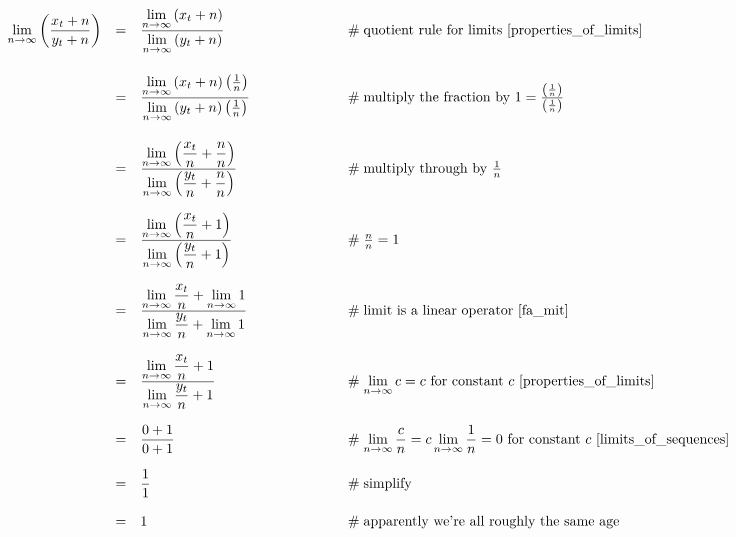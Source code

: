 \documentclass[11pt, oneside]{article}          %
\theoremstyle{definition}
\begin{document}
\begin{equation*}
\begin{array}{lllll}
{\displaystyle \lim_{n \to \infty} \left (\dfrac{x_t + n}{y_t + n}\right )}
&=& \dfrac{{\displaystyle \lim_{n \to \infty} \left (x_t + n \right )}} {{\displaystyle  \lim_{n \to \infty} \left (y_t + n \right)}}
					&\qquad \qquad \qquad \mathrel{\#} \text{quotient rule for limits \cite{properties_of_limits}} \\
[25pt]
&=& \dfrac{{\displaystyle \lim_{n \to \infty} \left (x_t + n \right )}\left (\frac{1}{n}\right )} 
          {{\displaystyle \lim_{n \to \infty} \left (y_t + n \right)} \left ( \frac{1}{n} \right )}
					&\qquad \qquad \qquad \mathrel{\#} \text{multiply the fraction by $1 
					= \frac{\left ( \frac{1}{n} \right )}{\left ( \frac{1}{n} \right )}$}\\
[25pt]
&=& \dfrac{{\displaystyle \lim_{n \to \infty} \left (\frac{x_t}{n} + \frac{n}{n} \right )}} 
           {{\displaystyle \lim_{n \to \infty} \left (\frac{y_t}{n} + \frac{n}{n} \right)}}
					&\qquad \qquad \qquad \mathrel{\#} \text{multiply through by $\frac{1}{n}$}\\
[25pt]
&=& \dfrac{{\displaystyle \lim_{n \to \infty}  \left (\frac{x_t}{n} + 1 \right )}} 
           {{\displaystyle \lim_{n \to \infty} \left (\frac{y_t}{n} + 1 \right)}}
					&\qquad \qquad \qquad \mathrel{\#} \frac{n}{n} = 1\\
[25pt]
&=& \dfrac{{\displaystyle \lim_{n \to \infty}   \frac{x_t}{n} + \lim_{n \to \infty} 1}} 
           {{\displaystyle \lim_{n \to \infty}  \frac{y_t}{n} + \lim_{n \to \infty} 1}}
					&\qquad \qquad \qquad \mathrel{\#} \text{limit is a linear operator \cite{fa_mit}} \\
[25pt]
&=& \dfrac{{\displaystyle \lim_{n \to \infty}  \frac{x_t}{n} + 1}} 
           {{\displaystyle \lim_{n \to \infty} \frac{y_t}{n} + 1}}
					&\qquad \qquad \qquad \mathrel{\#} \text{${\displaystyle \lim_{n \to \infty} c 
					= c}$ for constant $c$ \cite{properties_of_limits}} \\
[25pt]
&=& \dfrac{0 + 1} {0 + 1}
					&\qquad \qquad \qquad \mathrel{\#} 
					{\displaystyle \lim_{n \to \infty} \frac{c}{n} = c \lim_{n \to \infty} \frac{1}{n} = 0} 
					\text{ for constant $c$ \cite{limits_of_sequences}} \\
[15pt]
&=& \dfrac{1}{1}	&\qquad \qquad \qquad \mathrel{\#} \text{simplify} \\
[15pt]
&=& 1				&\qquad \qquad \qquad \mathrel{\#} \text{apparently we're all roughly the same age}
\end{array}
\end{equation*}
\end{document}
